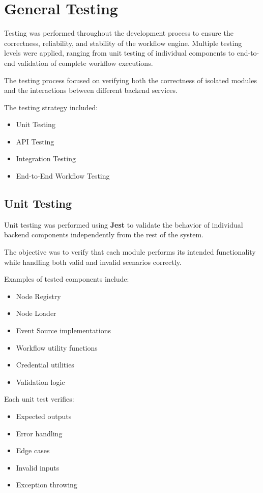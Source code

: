 
\section{General Testing}

Testing was performed throughout the development process to ensure the correctness, reliability, and stability of the workflow engine. Multiple testing levels were applied, ranging from unit testing of individual components to end-to-end validation of complete workflow executions.

The testing process focused on verifying both the correctness of isolated modules and the interactions between different backend services.

The testing strategy included:

\begin{itemize}
    \item Unit Testing
    \item API Testing
    \item Integration Testing
    \item End-to-End Workflow Testing
\end{itemize}


\subsection{Unit Testing}

Unit testing was performed using \textbf{Jest} to validate the behavior of individual backend components independently from the rest of the system.

The objective was to verify that each module performs its intended functionality while handling both valid and invalid scenarios correctly.

Examples of tested components include:

\begin{itemize}
    \item Node Registry
    \item Node Loader
    \item Event Source implementations
    \item Workflow utility functions
    \item Credential utilities
    \item Validation logic
\end{itemize}

Each unit test verifies:

\begin{itemize}
    \item Expected outputs
    \item Error handling
    \item Edge cases
    \item Invalid inputs
    \item Exception throwing
\end{itemize}

